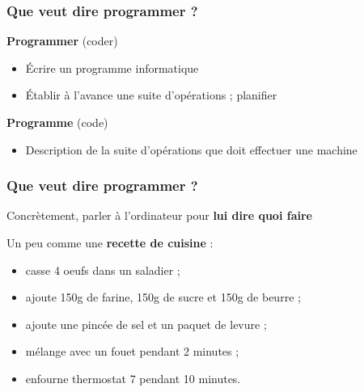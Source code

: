 \documentclass{beamer}
\begin{document}
\begin{frame}
    \frametitle{Que veut dire programmer ?}

    \begin{description} \item[\textbf{Programmer} (coder)] \end{description}
    
    \begin{itemize}
        \item Écrire un programme informatique
        \item Établir à l'avance une suite d'opérations ; planifier
    \end{itemize}
    
    \pause                                        
            
    \begin{description} \item[\textbf{Programme} (code)] \end{description}
    
    \begin{itemize}
     \item Description de la suite d'opérations que doit effectuer une machine
    \end{itemize}   
\end{frame}

\begin{frame}
    \frametitle{Que veut dire programmer ?}
    Concrètement, parler à l'ordinateur pour \textbf{lui dire quoi faire}
    
    \pause

    Un peu comme une \textbf{recette de cuisine} :
    \begin{itemize}
        \item casse 4 oeufs dans un saladier ;
        \item ajoute 150g de farine, 150g de sucre et 150g de beurre ;
        \item ajoute une pincée de sel et un paquet de levure ;
        \item mélange avec un fouet pendant 2 minutes ;
        \item enfourne thermostat 7 pendant 10 minutes.
    \end{itemize}
\end{frame}
\end{document}
